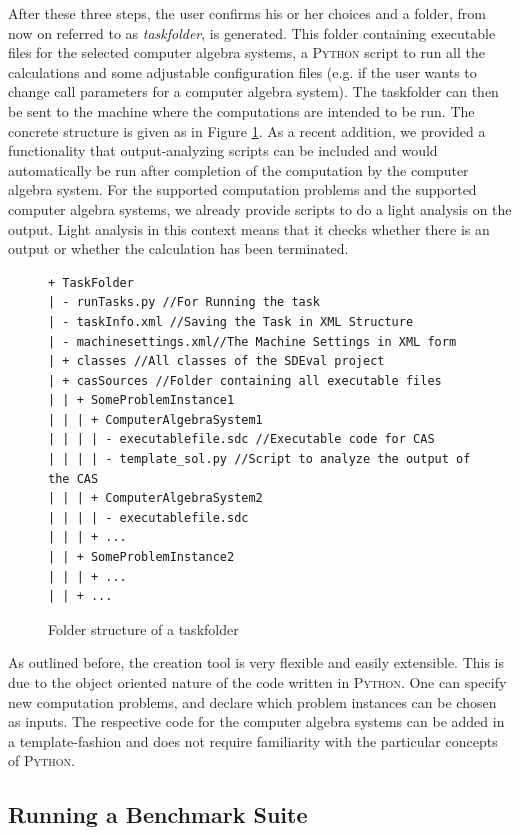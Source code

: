 \documentclass[12pt]{article}
\begin{document}
After these three steps, the user confirms his or her choices and a folder,
from now on referred to as \textit{taskfolder}, is generated. This folder
containing executable files for the selected computer algebra systems, a
\textsc{Python} script to run all the calculations and some adjustable
configuration files (e.g. if the user wants to change call parameters for a
computer algebra system). The taskfolder can then be sent to the machine where
the computations are intended to be run. The concrete structure is given as in
Figure \ref{fgr:TaskFolder}. As a recent addition, we provided a functionality
that output-analyzing scripts can be included and would automatically be run
after completion of the computation by the computer algebra system. For the
supported computation problems and the supported computer algebra systems, we
already provide scripts to do a light analysis on the output. Light analysis in
this context means that it checks whether there is an output or whether the
calculation has been terminated.

\begin{figure}
\caption{Folder structure of a taskfolder}
\label{fgr:TaskFolder}
{\scriptsize{
\begin{verbatim}
+ TaskFolder 
| - runTasks.py //For Running the task
| - taskInfo.xml //Saving the Task in XML Structure
| - machinesettings.xml//The Machine Settings in XML form 
| + classes //All classes of the SDEval project
| + casSources //Folder containing all executable files
| | + SomeProblemInstance1 
| | | + ComputerAlgebraSystem1
| | | | - executablefile.sdc //Executable code for CAS
| | | | - template_sol.py //Script to analyze the output of the CAS
| | | + ComputerAlgebraSystem2
| | | | - executablefile.sdc
| | | + ...
| | + SomeProblemInstance2
| | | + ...
| | + ...
\end{verbatim}}}
\end{figure}

As outlined before, the creation tool is very flexible and easily
extensible. This is due to the object oriented nature of the code written in
\textsc{Python}. One can specify new computation problems, and declare which
problem instances can be chosen as inputs. The respective code for the computer
algebra systems can be added in a template-fashion and does not require
familiarity with the particular concepts of \textsc{Python}.


\subsection{Running a Benchmark Suite}
\end{document}
